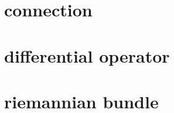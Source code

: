 \documentclass[dvipdfmx]{jsarticle}
\begin{document}
\section{connection}


\section{differential operator}


\section{riemannian bundle}

\end{document}
